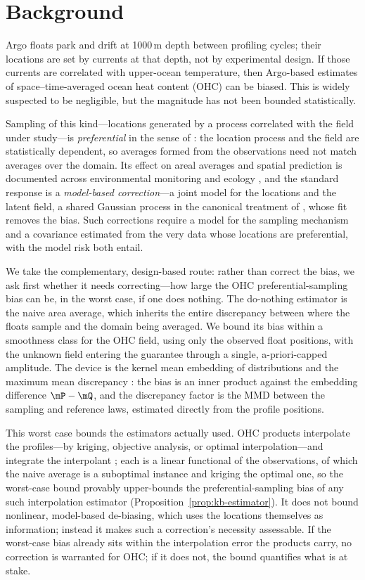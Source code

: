 \section{Background}
\label{sec:background}

Argo floats park and drift at 1000\,m depth between profiling cycles; their
locations are set by currents at that depth, not by experimental design. If those
currents are correlated with upper-ocean temperature, then Argo-based estimates
of space--time-averaged ocean heat content (OHC) can be biased. This is widely
suspected to be negligible, but the magnitude has not been bounded statistically.

Sampling of this kind---locations generated by a process correlated with the
field under study---is \emph{preferential} in the sense of \citet{diggle2010}:
the location process and the field are statistically dependent, so averages formed
from the observations need not match averages over the domain. Its effect on areal
averages and spatial prediction is documented across environmental monitoring and
ecology \citep{gelfand2012,zidek2014,conn2017,dumelle2022}, and the standard
response is a \emph{model-based correction}---a joint model for the locations and
the latent field, a shared Gaussian process in the canonical treatment of
\citet{diggle2010}, whose fit removes the bias. Such corrections require a model
for the sampling mechanism and a covariance estimated from the very data whose
locations are preferential, with the model risk both entail.

We take the complementary, design-based route: rather than correct the bias, we
ask first whether it needs correcting---how large the OHC preferential-sampling
bias can be, in the worst case, if one does nothing. The do-nothing estimator is
the naive area average, which inherits the entire discrepancy between where the
floats sample and the domain being averaged. We bound its bias within a smoothness
class for the OHC field, using only the observed float positions, with the unknown
field entering the guarantee through a single, a-priori-capped amplitude. The
device is the kernel mean embedding of distributions and the maximum mean
discrepancy \citep{smola2007,gretton2012,muandet2017}: the bias is an inner
product against the embedding difference $\mP-\mQ$, and the discrepancy factor is
the MMD between the sampling and reference laws, estimated directly from the
profile positions.

This worst case bounds the estimators actually used. OHC products interpolate the
profiles---by kriging, objective analysis, or optimal interpolation---and
integrate the interpolant \citep{baugh2022}; each is a linear functional of the
observations, of which the naive average is a suboptimal instance and kriging the
optimal one, so the worst-case bound provably upper-bounds the
preferential-sampling bias of any such interpolation estimator
(Proposition~\ref{prop:kb-estimator}). It does not bound nonlinear, model-based
de-biasing, which uses the locations themselves as information; instead it makes
such a correction's necessity assessable. If the worst-case bias already sits
within the interpolation error the products carry, no correction is warranted for
OHC; if it does not, the bound quantifies what is at stake.

